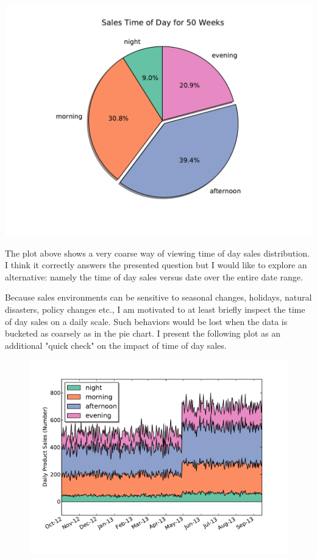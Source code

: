 \documentclass{article}[12pt]
\begin{document}
\includegraphics[scale=0.7]{../TimeOfDaySales.pdf}


The plot above shows a very coarse way of viewing time of day sales distribution.
I think it correctly answers the presented question but I would like to explore
an alternative: namely the time of day sales versus date over the entire date range.

Because sales environments can be sensitive to seasonal changes, holidays, natural disasters, policy changes etc., I am motivated to at least briefly inspect the time of
day sales on a daily scale. Such behaviors would be lost when the data is bucketed as coarsely as in the pie chart. I present the following plot as an additional "quick check" on the impact of time of day sales.

\begin{figure}[h!]
\includegraphics[scale=0.7]{../DataSalesTimeFilledLines.pdf}
\end{figure}
\end{document}
